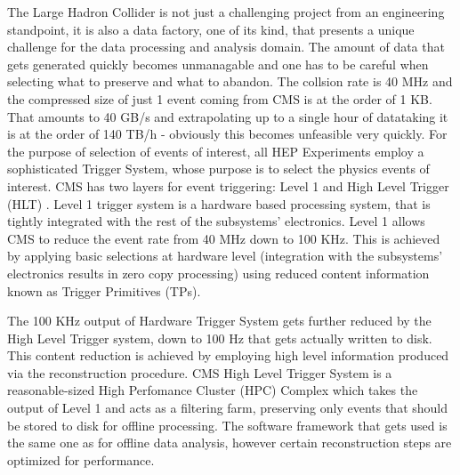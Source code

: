 The Large Hadron Collider is not just a challenging project from an engineering standpoint, it is also a data factory, one of its kind, that presents a unique challenge for the data processing and analysis domain. The amount of data that gets generated quickly becomes unmanagable and one has to be careful when selecting what to preserve and what to abandon. The collsion rate is 40 MHz and the compressed size of just 1 event coming from CMS is at the order of 1 KB. That amounts to 40 GB/s and extrapolating up to a single hour of datataking it is at the order of 140 TB/h - obviously this becomes unfeasible very quickly. For the purpose of selection of events of interest, all HEP Experiments employ a sophisticated Trigger System, whose purpose is to select the physics events of interest. CMS has two layers for event triggering: Level 1 \cite{L1Trigger} and High Level Trigger (HLT) \cite{HLTrigger}. Level 1 trigger system is a hardware based processing system, that is tightly integrated with the rest of the subsystems' electronics. Level 1 allows CMS to reduce the event rate from 40 MHz down to 100 KHz. This is achieved by applying basic selections at hardware level (integration with the subsystems' electronics results in zero copy processing) using reduced content information known as Trigger Primitives (TPs).

The 100 KHz output of Hardware Trigger System gets further reduced by the High Level Trigger system, down to 100 Hz that gets actually written to disk. This content reduction is achieved by employing high level information produced via the reconstruction procedure. CMS High Level Trigger System is a reasonable-sized High Perfomance Cluster (HPC) Complex which takes the output of Level 1 and acts as a filtering farm, preserving only events that should be stored to disk for offline processing. The software framework that gets used is the same one as for offline data analysis, however certain reconstruction steps are optimized for performance.




